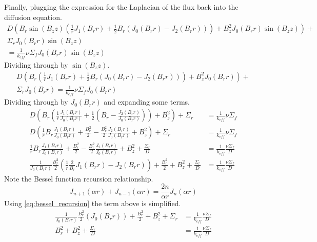   Finally, plugging the expression for the Laplacian of the flux back into the
  diffusion equation.
  \begin{multline}
    D \left( B_r \sin(B_z z) \left( \frac{1}{r} J_1(B_r r) + \frac{1}{2} B_r
    \left( J_0(B_r r) - J_2(B_r r) \right) \right) + B_z^2 J_0(B_r r) \sin(B_z
    z) \right) + \\
    \Sigma_r J_0(B_r r) \sin(B_z z) \\
    = \frac{1}{k_{eff}} \nu
    \Sigma_f J_0(B_r r) \sin(B_z z)
  \end{multline}
  Dividing through by $\sin(B_z z)$.
  \begin{multline}
    D \left( B_r \left( \frac{1}{r} J_1(B_r r) + \frac{1}{2} B_r
    \left( J_0(B_r r) - J_2(B_r r) \right) \right) + B_z^2 J_0(B_r r) \right)+\\
    \Sigma_r J_0(B_r r) = \frac{1}{k_{eff}} \nu \Sigma_f J_0(B_r r) 
  \end{multline}
  Dividing through by $J_0(B_r r)$ and expanding some terms.
  \begin{align}
    D \left( B_r \left( \frac{1}{r} \frac{J_1(B_r r)}{J_0(B_r r)} + 
      \frac{1}{2} \left(B_r - \frac{J_2(B_r r)}{J_0(B_r r)} \right) \right) 
      + B_z^2 \right)+ \Sigma_r &= \frac{1}{k_{eff}} \nu \Sigma_f \\
    D \left( \frac{1}{r} B_r \frac{J_1(B_r r)}{J_0(B_r r)} + \frac{B_r^2}{2} -
      \frac{B_r^2}{2} \frac{J_2(B_r r)}{J_0(B_r r)} + B_z^2 \right) + \Sigma_r&=
      \frac{1}{k_{eff}} \nu \Sigma_f  \\
    \frac{1}{r} B_r \frac{J_1(B_r r)}{J_0(B_r r)} + \frac{B_r^2}{2} -
      \frac{B_r^2}{2} \frac{J_2(B_r r)}{J_0(B_r r)} + B_z^2 + 
      \frac{\Sigma_r}{D} &= \frac{1}{k_{eff}} \frac{\nu \Sigma_f}{D}\\
    \frac{1}{J_0(B_r r)} \frac{B_r^2}{2} \left(\frac{1}{r} \frac{2}{B_r} 
      J_1(B_r r) - J_2(B_r r) \right) + \frac{B_r^2}{2} + B_z^2 + 
      \frac{\Sigma_r}{D} &= \frac{1}{k_{eff}} \frac{\nu \Sigma_f}{D}
  \end{align}
  Note the Bessel function recursion relationship.
  \begin{equation} \label{eq:bessel_recursion}
    J_{n+1}(\alpha r) + J_{n-1}(\alpha r) = \frac{2n}{\alpha r} J_n(\alpha r)
  \end{equation}
  Using \eqref{eq:bessel_recursion} the term above is simplified.
  \begin{align}
    \frac{1}{J_0(B_r r)} \frac{B_r^2}{2} \left( J_0(B_r r) \right) + 
      \frac{B_r^2}{2} + B_z^2 + \Sigma_r &= \frac{1}{k_{eff}} 
      \frac{\nu \Sigma_f}{D} \\
    B_r^2 + B_z^2 + \frac{\Sigma_r}{D} &= \frac{1}{k_{eff}} \frac{\nu \Sigma_f}
      {D}
  \end{align}
